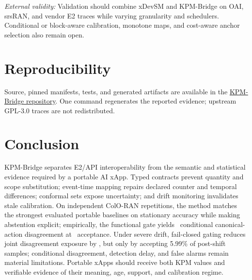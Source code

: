 \documentclass[10pt,journal,twoside]{IEEEtran}
\begin{document}
\emph{External validity:}
Validation should combine xDevSM and KPM-Bridge on OAI, srsRAN, and vendor E2 traces while varying granularity and schedulers. Conditional or block-aware calibration, monotone maps, and cost-aware anchor selection also remain open.

\section{Reproducibility}
Source, pinned manifests, tests, and generated artifacts are available in the \href{https://github.com/YassirALKarawi/kpm-bridge-open6g-ran}{KPM-Bridge repository}. One command regenerates the reported evidence; upstream GPL-3.0 traces are not redistributed.

\section{Conclusion}
KPM-Bridge separates E2/API interoperability from the semantic and statistical evidence required by a portable AI xApp. Typed contracts prevent quantity and scope substitution; event-time mapping repairs declared counter and temporal differences; conformal sets expose uncertainty; and drift monitoring invalidates stale calibration. On independent ColO-RAN repetitions, the method matches the strongest evaluated portable baselines on stationary accuracy while making abstention explicit; empirically, the functional gate yields \StableSelectiveError\ conditional canonical-action disagreement at \StableAcceptance\ acceptance. Under severe drift, fail-closed gating reduces joint disagreement exposure by \DriftExposureReduction, but only by accepting 5.99\% of post-shift samples; conditional disagreement, detection delay, and false alarms remain material limitations. Portable xApps should receive both KPM values and verifiable evidence of their meaning, age, support, and calibration regime.



\end{document}
